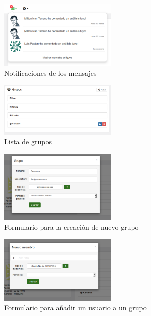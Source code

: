 	    \begin{figure}[h]
	    	\centering
	    	\includegraphics[width=0.5\textwidth]{img/notificacion_mensaje}
	    	\caption{Notificaciones de los mensajes}
	    	\label{notificacion_mensaje}
	    \end{figure}	
	    \begin{figure}[h]
	    	\centering
	    	\includegraphics[width=0.5\textwidth]{img/grupos}
	    	\caption{Lista de grupos}
	    	\label{grupos}
	    \end{figure}	    

	    \begin{figure}[h]
	    	\centering
	    	\includegraphics[width=0.5\textwidth]{img/nuevo_grupo}
	    	\caption{Formulario para la creación de nuevo grupo}
	    	\label{nuevo_grupo}
	    \end{figure}	    	    
	    
	    	    \begin{figure}[h]
	    	    	\centering
	    	    	\includegraphics[width=0.5\textwidth]{img/nuevo_usuario_grupo}
	    	    	\caption{Formulario para añadir un usuario a un grupo}
	    	    	\label{nuevo_usuario_grupo}
	    	    \end{figure}	    	    
	    	    
